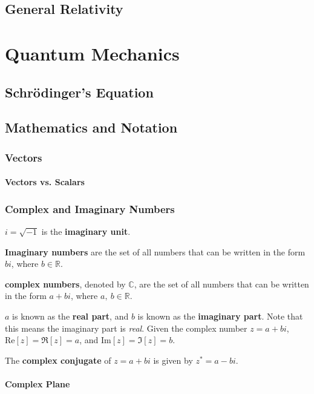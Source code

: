 \documentclass[a4paper, titlepage]{book}
\numberwithin{equation}{section}
\begin{document}
\chapter{General Relativity}


\part{Quantum Mechanics}

\chapter{Schrödinger's Equation}


\appendix
\chapter{Mathematics and Notation}

\section{Vectors} \label{section:vectors}

\subsection{Vectors vs. Scalars}

\section{Complex and Imaginary Numbers} \label{section:complex-and-imaginary-numbers}

\(i = \sqrt{-1}\) is the \textbf{imaginary unit}.

\textbf{Imaginary numbers} are the set of all numbers that can be written in the form \(bi\),
where \(b \in \mathbb{R}\).

\textbf{complex numbers}, denoted by \(\mathbb{C}\),
are the set of all numbers that can be written in the form \(a + bi\),
where \(a,~b \in \mathbb{R}\).

\(a\) is known as the \textbf{real part},
and \(b\) is known as the \textbf{imaginary part}.
Note that this means the imaginary part is \emph{real}.
Given the complex number \(z = a + bi\),
\(\mathrm{Re}[z] = \Re[z] = a\), and \(\mathrm{Im}[z] = \Im[z] = b\).

The \textbf{complex conjugate} of \(z = a + bi\) is given by \(z^* = a - bi\).

\subsection{Complex Plane}
\end{document}
